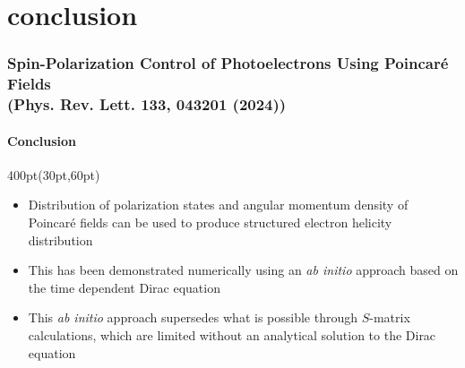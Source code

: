 
\section{conclusion}

\begin{frame}
\frametitle{Spin-Polarization Control of Photoelectrons
Using Poincar\'e Fields \\
\small (Phys. Rev. Lett. \textbf{133}, 043201 (2024))}
\framesubtitle{Conclusion}


\small
\begin{textblock*}{400pt}(30pt,60pt)
\vspace{30pt}
\begin{itemize}
\footnotesize
\item Distribution of polarization states 
and angular momentum density of Poincar\'e fields can be used to produce
structured electron helicity distribution
\item This has been demonstrated numerically using an \textit{ab initio}
approach based on the time dependent Dirac equation
\item This \textit{ab initio} approach supersedes what is possible through 
$S$-matrix calculations, which are limited without an analytical solution 
to the Dirac equation

\vspace{20pt}

\end{itemize}

\end{textblock*}



\end{frame}
